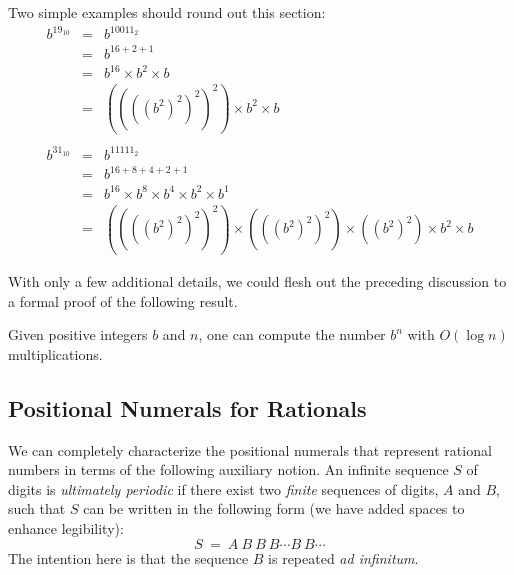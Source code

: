 \smallskip

Two simple examples should round out this section:
\begin{eqnarray*}
b^{19_{10}} & = & b^{10011_{2}} \\
        & = & b^{16 + 2 + 1} \\
        & = & b^{16} \times b^2 \times b \\
        & = & ((((b^2)^2)^2)^2) \times b^2 \times b \\
        &    & \\
b^{31_{10}} & = & b^{11111_{2}} \\
    & = & b^{16 + 8 + 4 + 2 + 1} \\
    & = & b^{16} \times b^8 \times b^4 \times b^2 \times b^1 \\
    & = & ((((b^2)^2)^2)^2) \times (((b^2)^2)^2) \times ((b^2)^2) \times b^2 \times b
\end{eqnarray*} 

\medskip

With only a few additional details, we could flesh out the preceding discussion to a formal proof of the following result.


\begin{prop}
\label{thm:fast-exponentiation}
Given positive integers $b$ and $n$, one can compute the number $b^n$ with $O(\log n)$ multiplications.
\end{prop}


\subsection{Positional Numerals for Rationals}
\label{sec:special-numerals-Q}


We can completely characterize the positional numerals that represent rational numbers in terms of the following auxiliary notion.  An infinite sequence $S$ of digits is {\em ultimately periodic} if there exist two {\em finite} sequences of digits, $A$ and $B$, such that $S$ can be written in the following form (we have added spaces to enhance legibility):
\begin{equation}
\label{eq:ult-per-seq}
 S \ = \ A \ B \ B \ B \cdots B \ B \cdots
\end{equation}
The intention here is that the sequence $B$ is repeated {\it ad infinitum}.

\smallskip

